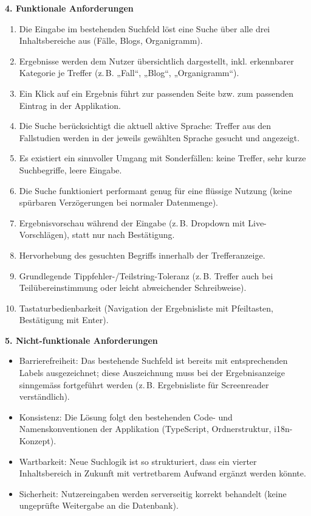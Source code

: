 \documentclass[11pt,a4paper]{article}
\newcommand{\minihead}[1]{\par\needspace{5\baselineskip}\noindent\textbf{#1}\par\nobreak}
\begin{document}
\minihead{4. Funktionale Anforderungen}
\begin{enumerate}[nosep]
  \item Die Eingabe im bestehenden Suchfeld löst eine Suche über alle drei Inhaltsbereiche aus (Fälle, Blogs, Organigramm).
  \item Ergebnisse werden dem Nutzer übersichtlich dargestellt, inkl. erkennbarer Kategorie je Treffer (z.\,B. „Fall“, „Blog“, „Organigramm“).
  \item Ein Klick auf ein Ergebnis führt zur passenden Seite bzw. zum passenden Eintrag in der Applikation.
  \item Die Suche berücksichtigt die aktuell aktive Sprache: Treffer aus den Fallstudien werden in der jeweils gewählten Sprache gesucht und angezeigt.
  \item Es existiert ein sinnvoller Umgang mit Sonderfällen: keine Treffer, sehr kurze Suchbegriffe, leere Eingabe.
  \item Die Suche funktioniert performant genug für eine flüssige Nutzung (keine spürbaren Verzögerungen bei normaler Datenmenge).
  \item Ergebnisvorschau während der Eingabe (z.\,B. Dropdown mit Live-Vorschlägen), statt nur nach Bestätigung.
  \item Hervorhebung des gesuchten Begriffs innerhalb der Trefferanzeige.
  \item Grundlegende Tippfehler-/Teilstring-Toleranz (z.\,B. Treffer auch bei Teilübereinstimmung oder leicht abweichender Schreibweise).
  \item Tastaturbedienbarkeit (Navigation der Ergebnisliste mit Pfeiltasten, Bestätigung mit Enter).
\end{enumerate}

\minihead{5. Nicht-funktionale Anforderungen}
\begin{itemize}[nosep]
  \item Barrierefreiheit: Das bestehende Suchfeld ist bereits mit entsprechenden Labels ausgezeichnet; diese Auszeichnung muss bei der Ergebnisanzeige sinngemäss fortgeführt werden (z.\,B. Ergebnisliste für Screenreader verständlich).
  \item Konsistenz: Die Lösung folgt den bestehenden Code- und Namenskonventionen der Applikation (TypeScript, Ordnerstruktur, i18n-Konzept).
  \item Wartbarkeit: Neue Suchlogik ist so strukturiert, dass ein vierter Inhaltsbereich in Zukunft mit vertretbarem Aufwand ergänzt werden könnte.
  \item Sicherheit: Nutzereingaben werden serverseitig korrekt behandelt (keine ungeprüfte Weitergabe an die Datenbank).
\end{itemize}
\end{document}
